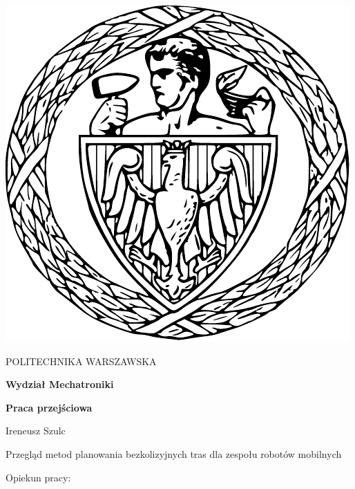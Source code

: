 
\thispagestyle {empty}

\begin{center}
	\includegraphics[scale=0.4]{img/pw}
	
	\vspace{0.5cm}
	
	{\fontsize{20}{20}\selectfont POLITECHNIKA WARSZAWSKA}
	
	\vspace{1.0cm}
	
	\textbf{{\fontsize{14}{14}\selectfont Wydział Mechatroniki}}
	
	\vspace{1.5cm}
	
	\textbf{{\fontsize{14}{14}\selectfont Praca przejściowa}}

	\vspace{2.0cm}
	
	{\fontsize{14}{14}\selectfont Ireneusz Szulc}
	
	\vspace{1cm}
	
	{\fontsize{28}{28}\selectfont Przegląd metod planowania bezkolizyjnych tras dla zespołu robotów mobilnych}
	
	\vspace{1cm}
	\begin{flushright}
		{\fontsize{14}{14}\selectfont Opiekun pracy: \\ 
		}
	

\end{flushright}
\end{center}
